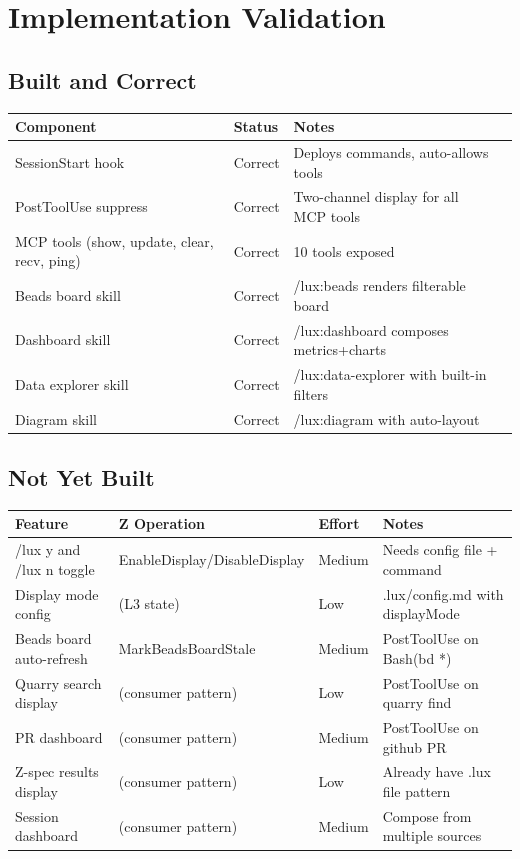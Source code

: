 \documentclass[a4paper,10pt,fleqn]{article}
\begin{document}
\section{Implementation Validation}

\subsection{Built and Correct}

\begin{tabular}{llll}
\hline
\textbf{Component} & \textbf{Status} & \textbf{Notes} \\
\hline
SessionStart hook & Correct & Deploys commands, auto-allows tools \\
PostToolUse suppress & Correct & Two-channel display for all MCP tools \\
MCP tools (show, update, clear, recv, ping) & Correct & 10 tools exposed \\
Beads board skill & Correct & /lux:beads renders filterable board \\
Dashboard skill & Correct & /lux:dashboard composes metrics+charts \\
Data explorer skill & Correct & /lux:data-explorer with built-in filters \\
Diagram skill & Correct & /lux:diagram with auto-layout \\
\hline
\end{tabular}

\subsection{Not Yet Built}

\begin{tabular}{llll}
\hline
\textbf{Feature} & \textbf{Z Operation} & \textbf{Effort} & \textbf{Notes} \\
\hline
/lux y and /lux n toggle & EnableDisplay/DisableDisplay & Medium & Needs config file + command \\
Display mode config & (L3 state) & Low & .lux/config.md with displayMode \\
Beads board auto-refresh & MarkBeadsBoardStale & Medium & PostToolUse on Bash(bd *) \\
Quarry search display & (consumer pattern) & Low & PostToolUse on quarry find \\
PR dashboard & (consumer pattern) & Medium & PostToolUse on github PR \\
Z-spec results display & (consumer pattern) & Low & Already have .lux file pattern \\
Session dashboard & (consumer pattern) & Medium & Compose from multiple sources \\
\hline
\end{tabular}
\end{document}

